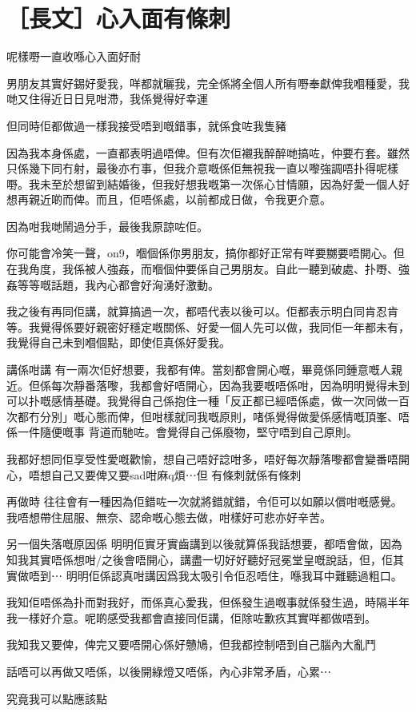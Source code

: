 \chapter{［長文］心入面有條刺}

呢樣嘢一直收喺心入面好耐

男朋友其實好錫好愛我，咩都就曬我，完全係將全個人所有嘢奉獻俾我嗰種愛，我哋又住得近日日見咁滯，我係覺得好幸運

但同時佢都做過一樣我接受唔到嘅錯事，就係食咗我隻豬

因為我本身係處，一直都表明過唔俾。但有次佢襯我醉醉哋搞咗，仲要冇套。雖然只係幾下同冇射，最後亦冇事，但我介意嘅係佢無視我一直以嚟強調唔扑得呢樣嘢。我未至於想留到結婚後，但我好想我嘅第一次係心甘情願，因為好愛一個人好想再親近啲而俾。而且，佢唔係處，以前都成日做，令我更介意。

因為咁我哋鬧過分手，最後我原諒咗佢。

你可能會冷笑一聲，on9，嗰個係你男朋友，搞你都好正常有咩要嬲要唔開心。但在我角度，我係被人強姦，而嗰個仲要係自己男朋友。自此一聽到破處、扑嘢、強姦等等嘅話題，我內心都會好洶湧好激動。

我之後有再同佢講，就算搞過一次，都唔代表以後可以。佢都表示明白同肯忍肯等。我覺得係要好親密好穩定嘅關係、好愛一個人先可以做，我同佢一年都未有，我覺得自己未到嗰個點，即使佢真係好愛我。

講係咁講 有一兩次佢好想要，我都有俾。當刻都會開心嘅，畢竟係同鍾意嘅人親近。但係每次靜番落嚟，我都會好唔開心，因為我要嘅唔係咁，因為明明覺得未到可以扑嘅感情基礎。我覺得自己係抱住一種「反正都已經唔係處，做一次同做一百次都冇分別」嘅心態而俾，但咁樣就同我嘅原則，啫係覺得做愛係感情嘅頂峯、唔係一件隨便嘅事 背道而馳咗。會覺得自己係廢物，堅守唔到自己原則。

我都好想同佢享受性愛嘅歡愉，想自己唔好諗咁多，唔好每次靜落嚟都會變番唔開心，唔想自己又要俾又要sad咁麻q煩⋯但 有條刺就係有條刺

再做時 往往會有一種因為佢錯咗一次就將錯就錯，令佢可以如願以償咁嘅感覺。我唔想帶住屈服、無奈、認命嘅心態去做，咁樣好可悲亦好辛苦。

另一個失落嘅原因係 明明佢實牙實齒講到以後就算係我話想要，都唔會做，因為知我其實唔係想咁/之後會唔開心，講盡一切好好聽好冠冕堂皇嘅說話，但，佢其實做唔到⋯ 明明佢係認真咁講因爲我太吸引令佢忍唔住，喺我耳中難聽過粗口。

我知佢唔係為扑而對我好，而係真心愛我，但係發生過嘅事就係發生過，時隔半年我一樣好介意。呢啲感受我都會直接同佢講，佢除咗歉疚其實咩都做唔到。

我知我又要俾，俾完又要唔開心係好戇鳩，但我都控制唔到自己腦內大亂鬥

話唔可以再做又唔係，以後開綠燈又唔係，內心非常矛盾，心累⋯

究竟我可以點應該點

